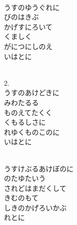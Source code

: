 \documentclass[10pt,b5j]{tarticle} %
\begin{document}
\vspace{1.5em} %
\newcommand{\linespace}{0.5em} %
\newcommand{\blocksize}{0.5\hsize} %
\newcommand{\itemmargin}{3em} %
\begin{enumerate} %
    \setlength{\itemindent}{\itemmargin} %
    \begin{minipage}[c]{\blocksize}
    
        \vspace{\linespace}
        \item~\\
        うすのゆうぐれに\\
        びのはきぶ\\
        かげすにろいて\\
        くましく\\
        がにつにしのえ\\
        いはとに
        
    \end{minipage}
    \begin{minipage}[c]{\blocksize}
        
        \vspace{\linespace}
        \item~\\
        2.	\\
        うすのあけどきに\\
        みわたるる\\
        ものえてたくく\\
        くもるしさに\\
        れゆくものこのに\\
        いはとに
        
    \end{minipage}
    \begin{minipage}[c]{\blocksize}
        
        \vspace{\linespace}
        \item~\\
        うすけぶるあけぼのに\\
        のたゆたいう\\
        されどはまだくして\\
        きむのもて\\
        しきのかげろいかぶ\\
        れとに
        

\end{minipage}
\end{enumerate}
\end{document}

